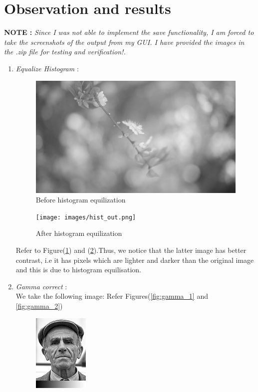 \documentclass[conference]{IEEEtran}
\begin{document}
{{\section*{Observation and results}
\textbf{NOTE : }\textit{ Since I was not able to implement the save functionality, I am forced to take the screenshots of the output from my GUI. I have provided the images in the .zip file for testing and verification!.}
\begin{enumerate}
    \item \textit{Equalize Histogram} :\\ 
    \begin{figure}[htbp]
\centerline{\includegraphics[scale = 0.30]{images/hist.jpeg}}
\caption{Before histogram equilization}
\label{fig:hist_eq_1}
\end{figure}
    \begin{figure}[htbp]
\centerline{\texttt{[image: images/hist\_out.png]}}
\caption{After histogram equilization}
\label{fig:hist_eq_2}
\end{figure}
\newline Refer to Figure(\ref{fig:hist_eq_1}) and (\ref{fig:hist_eq_2}).Thus, we notice that the latter image has better contrast, i.e it has pixels which are lighter and darker than the original image and this is due to histogram equilisation.
\item \textit{Gamma correct} :\\
 We take the following image: Refer Figures(\ref{fig:gamma_1} and \ref{fig:gamma_2})
     \begin{figure}[htbp]
\centerline{\includegraphics[scale = 1]{images/gamma.jpg}}

\end{figure}
\end{enumerate}}}
\end{document}
